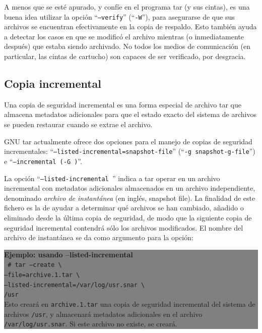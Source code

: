 \documentclass[12pt]{article}
\begin{document}
A menos que se esté apurado, y confíe en el programa tar (y sus cintas),
es una buena idea utilizar la opción ``{\tt --verify}'' (``{\tt -W}''),
para asegurarse de que sus archivos se encuentran efectivamente en la 
copia de respaldo. Esto también ayuda a detectar los casos en que se 
modificó el archivo mientras (o inmediatamente después) que estaba siendo
archivado. No todos los medios de comunicación (en particular, las cintas 
de cartucho) son capaces de ser verificado, por desgracia.

\subsection*{Copia incremental}
Una copia de seguridad incremental es una forma especial de archivo tar que 
almacena metadatos adicionales para que el estado exacto del sistema de 
archivos se pueden restaurar cuando se extrae el archivo.

GNU tar actualmente ofrece dos opciones para el manejo de copias de 
seguridad incrementales: ``{\tt --listed-incremental=snapshot-file}'' 
(``{\tt -g snapshot-g-file}'') e ``{\tt --incremental (-G )}''.

La opción ``{\tt --listed-incremental }'' indica a tar operar en un archivo 
incremental con metadatos adicionales almacenados en un archivo 
independiente, denominado \textit{archivo de instantánea} (en inglés, 
snapshot file). La finalidad de este fichero es la de ayudar a determinar 
qué archivos se han cambiado, añadido o eliminado desde la última copia 
de seguridad, de modo que la siguiente copia de seguridad incremental 
contendrá sólo los archivos modificados. El nombre del archivo de 
instantánea se da como argumento para la opción:


\colorbox{grey}{\parbox[t]{0.95\linewidth}{ \vspace*{0.5cm} { 
{\bf Ejemplo: usando --listed-incremental } \\
{\tt
\# tar --create \textbackslash \\
           --file=archive.1.tar \textbackslash \\
           --listed-incremental=/var/log/usr.snar \textbackslash \\
           /usr \\
}
Esto creará en {\tt archive.1.tar} una copia de seguridad incremental del 
sistema de archivos {\tt /usr}, y almacenará metadatos adicionales en el 
archivo {\tt /var/log/usr.snar}. Si este archivo no existe, se creará.
} \vspace*{0.5cm} } } 
\end{document}
